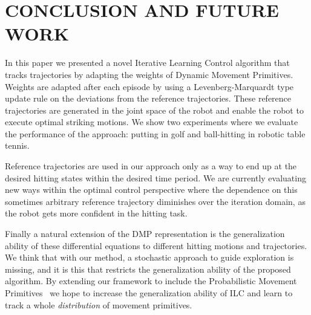 \section{CONCLUSION AND FUTURE WORK}\label{conclusion}

In this paper we presented a novel Iterative Learning Control algorithm that tracks trajectories by adapting the weights of Dynamic Movement Primitives. Weights are adapted after each episode by using a Levenberg-Marquardt type update rule on the deviations from the reference trajectories. These reference trajectories are generated in the joint space of the robot and enable the robot to execute optimal striking motions. We show two experiments where we evaluate the performance of the approach: putting in golf and ball-hitting in robotic table tennis. 

Reference trajectories are used in our approach only as a way to end up at the desired hitting states within the desired time period. We are currently evaluating new ways within the optimal control perspective where the dependence on this sometimes arbitrary reference trajectory diminishes over the iteration domain, as the robot gets more confident in the hitting task.

Finally a natural extension of the DMP representation is the generalization ability of these differential equations to different hitting motions and trajectories. We think that with our method, a stochastic approach to guide exploration is missing, and it is this that restricts the generalization ability of the proposed algorithm. By extending our framework to include the Probabilistic Movement Primitives~\cite{Paraschos13} we hope to increase the generalization ability of ILC and learn to track a whole \emph{distribution} of movement primitives.

%
%
%
